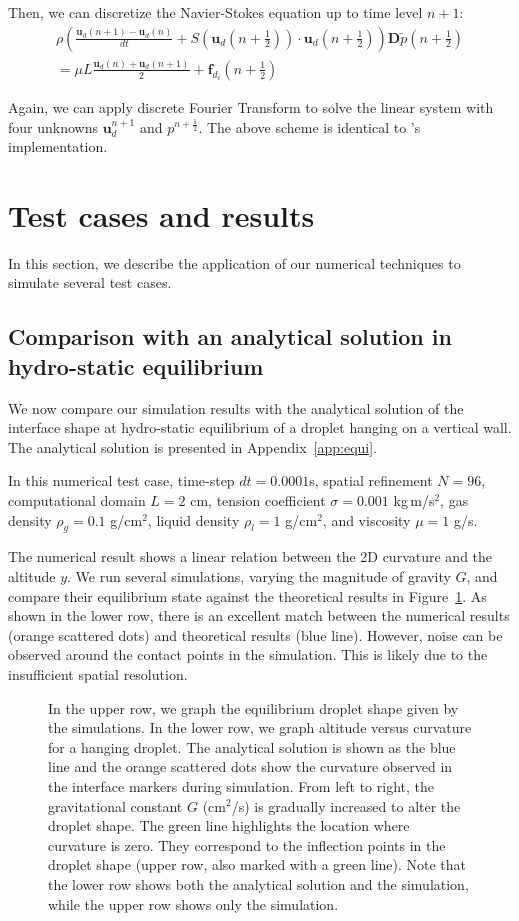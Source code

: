 \documentclass{jfm}
\begin{document}
Then, we can discretize the Navier-Stokes equation up to time level $n+1$:
\begin{multline}
    \rho\left(\frac{\bm{u}_d(n+1)-\bm{u}_d(n)}{dt}+S(\bm{u}_d(n+\frac{1}{2}))\cdot\bm{u}_d(n+\frac{1}{2})\right)\bm{D}\tilde{p}(n+\frac{1}{2}) \\ = \mu L\frac{\bm{u}_d(n)+\bm{u}_d(n+1)}{2}+\bm{f}_{d_i}(n+\frac{1}{2})
\end{multline}

Again, we can apply discrete Fourier Transform to solve the linear system with four unknowns $\bm{u}_d^{n+1}$ and $p^{n+\frac{1}{2}}$. The above scheme is identical to \cite{ib_matlab}'s implementation. 

\section {Test cases and results\label{sec:5}}
In this section, we describe the application of our numerical techniques to simulate several test cases. 
\subsection {Comparison with an analytical solution in hydro-static equilibrium}
We now compare our simulation results with the analytical solution of the interface shape at hydro-static equilibrium of a droplet hanging on a vertical wall. The analytical solution is presented in Appendix~\ref{app:equi}. 

In this numerical test case, time-step $dt=0.0001$s, spatial refinement $N=96$, computational domain $L=2$ cm, tension coefficient $\sigma=0.001$ kg\,m/s$^2$, gas density $\rho_g=0.1$ g/cm$^2$, liquid density $\rho_l=1$ g/cm$^2$, and viscosity $\mu=1$ g/s. 

The numerical result shows a linear relation between the 2D curvature and the altitude $y$. We run several simulations, varying the magnitude of gravity $G$, and compare their equilibrium state against the theoretical results in Figure~\ref{fig:h-curvature}. As shown in the lower row, there is an excellent match between the numerical results (orange scattered dots) and theoretical results (blue line). However, noise can be observed around the contact points in the simulation. This is likely due to the insufficient spatial resolution. 
    
\begin{figure}
\caption{\label{fig:h-curvature} In the upper row, we graph the equilibrium droplet shape given by the simulations. In the lower row, we graph altitude versus curvature for a hanging droplet. The analytical solution is shown as the blue line and the orange scattered dots show the curvature observed in the interface markers during simulation. From left to right, the gravitational constant $G$ (cm$^2$/s) is gradually increased to alter the droplet shape. The green line highlights the location where curvature is zero. They correspond to the inflection points in the droplet shape (upper row, also marked with a green line). Note that the lower row shows both the analytical solution and the simulation, while the upper row shows only the simulation.}
\end{figure}
\end{document}
